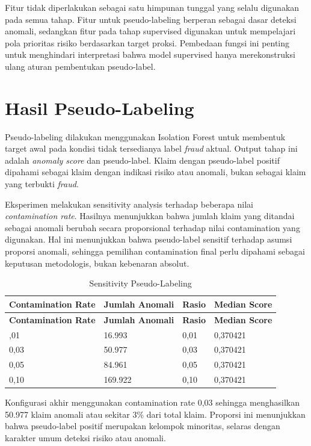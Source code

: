 Fitur tidak diperlakukan sebagai satu himpunan tunggal yang selalu digunakan pada semua tahap. Fitur untuk pseudo-labeling berperan sebagai dasar deteksi anomali, sedangkan fitur pada tahap supervised digunakan untuk mempelajari pola prioritas risiko berdasarkan target proksi. Pembedaan fungsi ini penting untuk menghindari interpretasi bahwa model supervised hanya merekonstruksi ulang aturan pembentukan pseudo-label.

\section{Hasil Pseudo-Labeling}\label{hasil-pseudo-labeling}

Pseudo-labeling dilakukan menggunakan Isolation Forest untuk membentuk target awal pada kondisi tidak tersedianya label \emph{fraud} aktual. Output tahap ini adalah \emph{anomaly score} dan pseudo-label. Klaim dengan pseudo-label positif dipahami sebagai klaim dengan indikasi risiko atau anomali, bukan sebagai klaim yang terbukti \emph{fraud}.

Eksperimen melakukan sensitivity analysis terhadap beberapa nilai \emph{contamination rate}. Hasilnya menunjukkan bahwa jumlah klaim yang ditandai sebagai anomali berubah secara proporsional terhadap nilai contamination yang digunakan. Hal ini menunjukkan bahwa pseudo-label sensitif terhadap asumsi proporsi anomali, sehingga pemilihan contamination final perlu dipahami sebagai keputusan metodologis, bukan kebenaran absolut.

\begin{longtable}[]{@{}p{}p{}p{}p{}@{}}
\caption{Sensitivity Pseudo-Labeling}\label{tab:sensitivity-pseudo-labeling}\\
\toprule
\textbf{Contamination Rate} & \textbf{Jumlah Anomali} & \textbf{Rasio} & \textbf{Median Score} \\
\midrule
\endfirsthead
\toprule
\textbf{Contamination Rate} & \textbf{Jumlah Anomali} & \textbf{Rasio} & \textbf{Median Score} \\
\midrule
\endhead
\bottomrule
\endfoot
0,01 & 16.993 & 0,01 & 0,370421 \\
0,03 & 50.977 & 0,03 & 0,370421 \\
0,05 & 84.961 & 0,05 & 0,370421 \\
0,10 & 169.922 & 0,10 & 0,370421 \\
\end{longtable}

Konfigurasi akhir menggunakan contamination rate 0,03 sehingga menghasilkan 50.977 klaim anomali atau sekitar 3\% dari total klaim. Proporsi ini menunjukkan bahwa pseudo-label positif merupakan kelompok minoritas, selaras dengan karakter umum deteksi risiko atau anomali.

